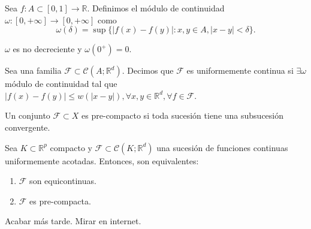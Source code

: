 \begin{defn}
  Sea $f: A \subset [0,1] \to \mathbb{R}$. Definimos el módulo de continuidad $\omega: [0,+ \infty] \to [0, + \infty]$ como 
  \[ 
    \omega(\delta) = \sup \{ |f(x)-f(y)| : x,y \in A, |x-y|<\delta\}.
  \] 
\end{defn}

\begin{obs}
  $\omega$ es no decreciente y $\omega(0^{+})=0$.
\end{obs}

\begin{defn}
  Sea una familia $\mathcal{F} \subset \mathcal{C}(A;\mathbb{R}^d)$. Decimos que $\mathcal{F}$ es uniformemente continua si $\exists \omega$ módulo de continuidad tal que $| f(x) - f(y) |\leq w(|x-y|), \forall x,y \in \mathbb{R}^{d}, \forall f \in \mathcal{F}$.
\end{defn}

\begin{defn}
  Un conjunto $\mathcal{F} \subset X$ es pre-compacto si toda sucesión tiene una subsucesión convergente.
\end{defn}

\begin{theo}
  Sea $K \subset \mathbb{R}^{p}$ compacto y $\mathcal{F} \subset \mathcal{C}(K;\mathbb{R}^d)$ una sucesión de funciones continuas uniformemente acotadas. Entonces, son equivalentes:
  \begin{enumerate}[label=(\roman*)]
    \item $\mathcal{F}$ son equicontinuas.
    \item $\mathcal{F}$ es pre-compacta.
  \end{enumerate}
\end{theo}

\begin{dem}
  Acabar más tarde. Mirar en internet.
\end{dem}
